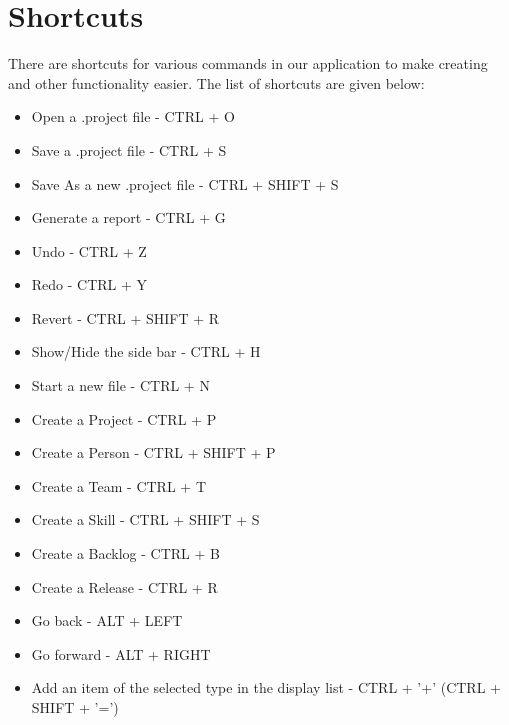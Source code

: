 \section{Shortcuts}

There are shortcuts for various commands in our application to make creating and other functionality easier. The list of shortcuts are given below:

\begin{itemize}
\item Open a .project file - CTRL + O
\item Save a .project file - CTRL + S
\item Save As a new .project file - CTRL + SHIFT + S
\item Generate a report - CTRL + G
\item Undo - CTRL + Z
\item Redo - CTRL + Y
\item Revert - CTRL + SHIFT + R
\item Show/Hide the side bar - CTRL + H
\item Start a new file - CTRL + N
\item Create a Project - CTRL + P
\item Create a Person - CTRL + SHIFT + P
\item Create a Team - CTRL + T
\item Create a Skill - CTRL + SHIFT + S
\item Create a Backlog - CTRL + B
\item Create a Release - CTRL + R
\item Go back - ALT + LEFT
\item Go forward - ALT + RIGHT
\item Add an item of the selected type in the display list - CTRL + '+' (CTRL + SHIFT + '=')
\end{itemize}